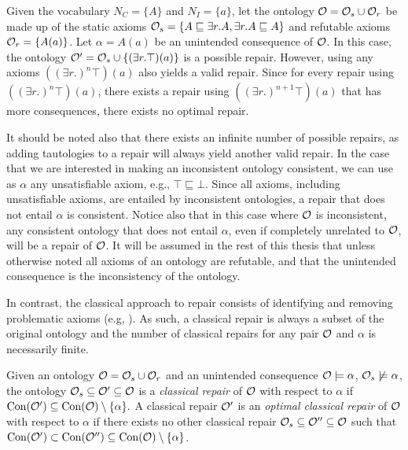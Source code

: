 \begin{example}\label{ex:no-optimal}
  Given the vocabulary $N_C = \{ A \}$ and $N_I = \{ a \}$, let the ontology $\mathcal{O} = \mathcal{O}_s \cup \mathcal{O}_r$ be made up of the static axioms $\mathcal{O}_s = \{ A \sqsubseteq \exists r.A, \exists r.A \sqsubseteq A \}$ and refutable axioms $\mathcal{O}_r = \{ A(a) \}$. Let $\alpha = A(a)$ be an unintended consequence of $\mathcal{O}$. In this case, the ontology $\mathcal{O}' = \mathcal{O}_s \cup \{ (\exists r.\top) (a) \}$ is a possible repair. However, using any axioms $((\exists r.)^n\top) (a)$ also yields a valid repair. Since for every repair using $((\exists r.)^n\top) (a)$, there exists a repair using $((\exists r.)^{n + 1}\top) (a)$ that has more consequences, there exists no optimal repair.
\end{example}

It should be noted also that there exists an infinite number of possible repairs, as adding tautologies to a repair will always yield another valid repair. In the case that we are interested in making an inconsistent ontology consistent, we can use as $\alpha$ any unsatisfiable axiom, e.g., $\top \sqsubseteq \bot$. Since all axioms, including unsatisfiable axioms, are entailed by inconsistent ontologies, a repair that does not entail $\alpha$ is consistent. Notice also that in this case where $\mathcal{O}$ is inconsistent, any consistent ontology that does not entail $\alpha$, even if completely unrelated to $\mathcal{O}$, will be a repair of $\mathcal{O}$. It will be assumed in the rest of this thesis that unless otherwise noted all axioms of an ontology are refutable, and that the unintended consequence is the inconsistency of the ontology.

In contrast, the classical approach to repair consists of identifying and removing problematic axioms (e.g, \cite{schlobach2003non,kalyanpur2005debugging,kalyanpur2006repairing,BaPS07}). As such, a classical repair is always a subset of the original ontology and the number of classical repairs for any pair $\mathcal{O}$ and $\alpha$ is necessarily finite.

\begin{definition}
  Given an ontology $\mathcal{O} = \mathcal{O}_s \cup \mathcal{O}_r$ and an unintended consequence $\mathcal{O} \models \alpha$, $\mathcal{O}_s \not\models \alpha$, the ontology $\mathcal{O}_s \subseteq \mathcal{O}' \subseteq \mathcal{O}$ is a \emph{classical repair} of $\mathcal{O}$ with respect to $\alpha$ if $\operatorname{Con}(\mathcal{O}') \subseteq \operatorname{Con}(\mathcal{O}) \setminus \{\alpha\}.$ A classical repair $\mathcal{O}'$ is an \emph{optimal classical repair} of $\mathcal{O}$ with respect to $\alpha$ if there exists no other classical repair $\mathcal{O}_s \subseteq \mathcal{O}'' \subseteq \mathcal{O}$ such that $\operatorname{Con}(\mathcal{O}') \subset \operatorname{Con}(\mathcal{O}'') \subseteq \operatorname{Con}(\mathcal{O}) \setminus \{\alpha\}$.
\end{definition}

